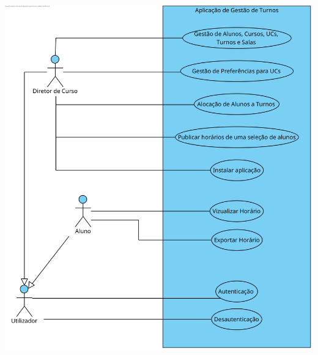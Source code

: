 \documentclass[a4paper,12pt]{scrreprt}
\begin{document}
\begin{minipage}{\textwidth}
    \centering
    \includegraphics[width=1\textwidth]{images/use-cases/diagrams/1-geral.png}
    \label{fig:2-1-diagrama_de_casos_de_uso_geral}
\end{minipage}
\end{document}
